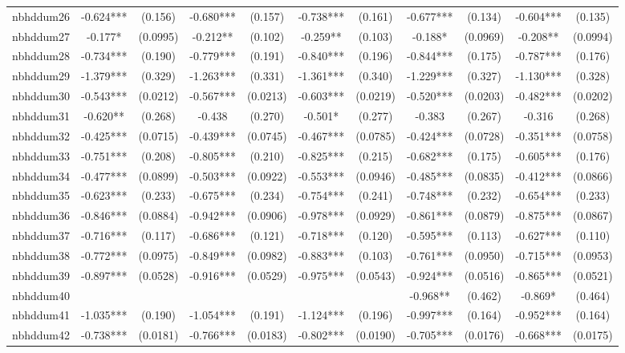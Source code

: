 \documentclass[]{article}
\begin{document}
\begin{tabular}{lcccccccccc}
nbhddum26 & -0.624*** & (0.156) & -0.680*** & (0.157) & -0.738*** & (0.161) & -0.677*** & (0.134) & -0.604*** & (0.135) \\
nbhddum27 & -0.177* & (0.0995) & -0.212** & (0.102) & -0.259** & (0.103) & -0.188* & (0.0969) & -0.208** & (0.0994) \\
nbhddum28 & -0.734*** & (0.190) & -0.779*** & (0.191) & -0.840*** & (0.196) & -0.844*** & (0.175) & -0.787*** & (0.176) \\
nbhddum29 & -1.379*** & (0.329) & -1.263*** & (0.331) & -1.361*** & (0.340) & -1.229*** & (0.327) & -1.130*** & (0.328) \\
nbhddum30 & -0.543*** & (0.0212) & -0.567*** & (0.0213) & -0.603*** & (0.0219) & -0.520*** & (0.0203) & -0.482*** & (0.0202) \\
nbhddum31 & -0.620** & (0.268) & -0.438 & (0.270) & -0.501* & (0.277) & -0.383 & (0.267) & -0.316 & (0.268) \\
nbhddum32 & -0.425*** & (0.0715) & -0.439*** & (0.0745) & -0.467*** & (0.0785) & -0.424*** & (0.0728) & -0.351*** & (0.0758) \\
nbhddum33 & -0.751*** & (0.208) & -0.805*** & (0.210) & -0.825*** & (0.215) & -0.682*** & (0.175) & -0.605*** & (0.176) \\
nbhddum34 & -0.477*** & (0.0899) & -0.503*** & (0.0922) & -0.553*** & (0.0946) & -0.485*** & (0.0835) & -0.412*** & (0.0866) \\
nbhddum35 & -0.623*** & (0.233) & -0.675*** & (0.234) & -0.754*** & (0.241) & -0.748*** & (0.232) & -0.654*** & (0.233) \\
nbhddum36 & -0.846*** & (0.0884) & -0.942*** & (0.0906) & -0.978*** & (0.0929) & -0.861*** & (0.0879) & -0.875*** & (0.0867) \\
nbhddum37 & -0.716*** & (0.117) & -0.686*** & (0.121) & -0.718*** & (0.120) & -0.595*** & (0.113) & -0.627*** & (0.110) \\
nbhddum38 & -0.772*** & (0.0975) & -0.849*** & (0.0982) & -0.883*** & (0.103) & -0.761*** & (0.0950) & -0.715*** & (0.0953) \\
nbhddum39 & -0.897*** & (0.0528) & -0.916*** & (0.0529) & -0.975*** & (0.0543) & -0.924*** & (0.0516) & -0.865*** & (0.0521) \\
nbhddum40 &  &  &  &  &  &  & -0.968** & (0.462) & -0.869* & (0.464) \\
nbhddum41 & -1.035*** & (0.190) & -1.054*** & (0.191) & -1.124*** & (0.196) & -0.997*** & (0.164) & -0.952*** & (0.164) \\
nbhddum42 & -0.738*** & (0.0181) & -0.766*** & (0.0183) & -0.802*** & (0.0190) & -0.705*** & (0.0176) & -0.668*** & (0.0175) \\

\end{tabular}
\end{document}

